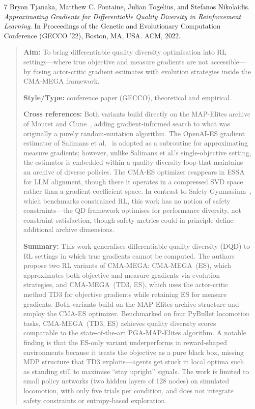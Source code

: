 \documentclass[12pt, a4paper]{article}
\begin{document}
\begin{thebibliography}{7}
Bryon Tjanaka, Matthew C. Fontaine, Julian Togelius, and Stefanos Nikolaidis.
\textit{Approximating Gradients for Differentiable Quality Diversity in Reinforcement Learning}.
In Proceedings of the Genetic and Evolutionary Computation Conference (GECCO '22), Boston, MA, USA. ACM, 2022.

\begin{quotation}
\noindent
\textbf{Aim:} To bring differentiable quality diversity optimisation into RL settings---where true objective and measure gradients are not accessible---by fusing actor-critic gradient estimates with evolution strategies inside the CMA-MEGA framework.

\textbf{Style/Type:} conference paper (GECCO), theoretical and empirical.

\textbf{Cross references:} Both variants build directly on the MAP-Elites archive of Mouret and Clune~\cite{mouret2015illuminating}, adding gradient-informed search to what was originally a purely random-mutation algorithm. The OpenAI-ES gradient estimator of Salimans et al.~\cite{salimans2017evolution} is adopted as a subroutine for approximating measure gradients; however, unlike Salimans et al.'s single-objective setting, the estimator is embedded within a quality-diversity loop that maintains an archive of diverse policies. The CMA-ES optimizer reappears in ESSA~\cite{korotyshova2025essa} for LLM alignment, though there it operates in a compressed SVD space rather than a gradient-coefficient space. In contrast to Safety-Gymnasium~\cite{ji2023safety}, which benchmarks constrained RL, this work has no notion of safety constraints---the QD framework optimises for performance diversity, not constraint satisfaction, though safety metrics could in principle define additional archive dimensions.

\textbf{Summary:} This work generalises differentiable quality diversity (DQD) to RL settings in which true gradients cannot be computed. The authors propose two RL variants of CMA-MEGA: CMA-MEGA~(ES), which approximates both objective and measure gradients via evolution strategies, and CMA-MEGA~(TD3, ES), which uses the actor-critic method TD3 for objective gradients while retaining ES for measure gradients. Both variants build on the MAP-Elites archive structure and employ the CMA-ES optimizer. Benchmarked on four PyBullet locomotion tasks, CMA-MEGA~(TD3, ES) achieves quality diversity scores comparable to the state-of-the-art PGA-MAP-Elites algorithm. A notable finding is that the ES-only variant underperforms in reward-shaped environments because it treats the objective as a pure black box, missing MDP structure that TD3 exploits---agents get stuck in local optima such as standing still to maximise ``stay upright'' signals. The work is limited to small policy networks (two hidden layers of 128 nodes) on simulated locomotion, with only five trials per condition, and does not integrate safety constraints or entropy-based exploration.
\end{quotation}


\end{thebibliography}
\end{document}
